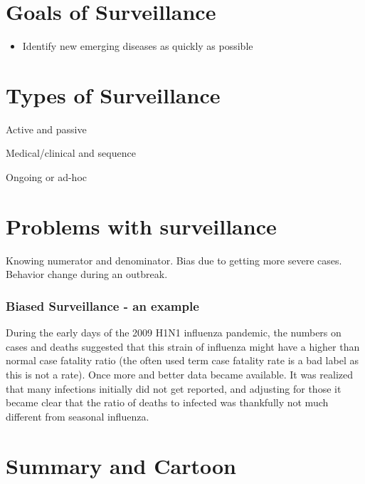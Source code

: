\documentclass[]{book}
\providecommand{\tightlist}{%
  \setlength{\itemsep}{0pt}\setlength{\parskip}{0pt}}
\theoremstyle{definition}
\theoremstyle{definition}
\theoremstyle{definition}
\theoremstyle{remark}
\begin{document}
\section{Goals of Surveillance}\label{goals-of-surveillance}

\begin{itemize}
\tightlist
\item
  Identify new emerging diseases as quickly as possible
\end{itemize}

\section{Types of Surveillance}\label{types-of-surveillance}

Active and passive

Medical/clinical and sequence

Ongoing or ad-hoc

\section{Problems with surveillance}\label{problems-with-surveillance}

Knowing numerator and denominator. Bias due to getting more severe
cases. Behavior change during an outbreak.

\subsubsection{Biased Surveillance - an example}\label{myexamplebox}

During the early days of the 2009 H1N1 influenza pandemic, the numbers
on cases and deaths suggested that this strain of influenza might have a
higher than normal case fatality ratio (the often used term case
fatality rate is a bad label as this is not a rate). Once more and
better data became available. It was realized that many infections
initially did not get reported, and adjusting for those it became clear
that the ratio of deaths to infected was thankfully not much different
from seasonal influenza.

\section{Summary and Cartoon}\label{summary-and-cartoon-9}
\end{document}
